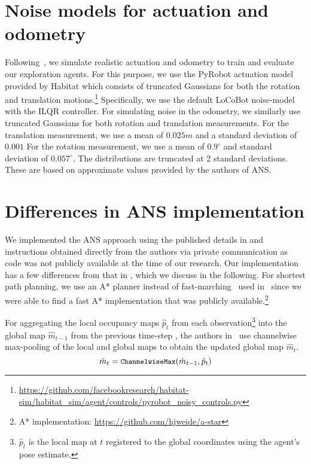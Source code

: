 \documentclass[runningheads]{llncs}
\newcommand{\code}[1]{\texttt{\small #1}}
\begin{document}
\section{Noise models for actuation and odometry}
\label{sec:noise_models}
Following~\cite{chaplot2020learning}, we simulate realistic actuation and odometry to train and evaluate our exploration agents. For this purpose, we use the PyRobot actuation model provided by Habitat which consists of truncated Gaussians for both the rotation and translation motions.\footnote{\url{https://github.com/facebookresearch/habitat-sim/habitat_sim/agent/controls/pyrobot_noisy_controls.py}} Specifically, we use the default LoCoBot noise-model with the ILQR controller. For simulating noise in the odometry, we similarly use truncated Gaussians for both rotation and translation measurements. For the translation measurement, we use a mean of $0.025\si{m}$ and a standard deviation of $0.001$ For the rotation measurement, we use a mean of $0.9^\circ$ and standard deviation of $0.057^\circ$. The distributions are truncated at 2 standard deviations. These are based on approximate values provided by the authors of ANS.


\section{Differences in ANS implementation}
\label{sec:differences_ans}
We implemented the ANS approach using the published details in \cite{chaplot2020learning} and instructions obtained directly from the authors via private communication as code was not publicly available at the time of our research. Our implementation has a few differences from that in \cite{chaplot2020learning}, which we discuss in the following. For shortest path planning, we use an A* planner instead of fast-marching~\cite{sethian1996fast} used in~\cite{chaplot2020learning} since we were able to find a fast A* implementation that was publicly available.\footnote{A* implementation: \url{https://github.com/hjweide/a-star}}

For aggregating the local occupancy maps $\hat{p}_{t}$ from each observation\footnote{$\hat{p}_{t}$ is the local map at $t$ registered to the global coordinates using the agent's pose estimate.} into the global map $\hat{m}_{t-1}$ from the previous time-step , the authors in~\cite{chaplot2020learning} use channelwise max-pooling of the local and global maps to obtain the updated global map $\hat{m}_{t}$.
\begin{equation}
    \hat{m}_{t} = \text{\code{ChannelwiseMax}}(\hat{m}_{t-1}, \hat{p}_{t})
\end{equation}
\end{document}

